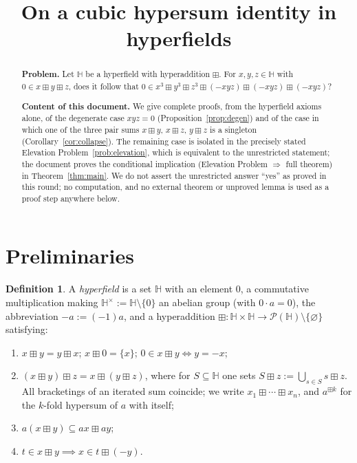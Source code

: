\documentclass[11pt]{article}
\title{On a cubic hypersum identity in hyperfields}
\author{}
\date{}
\theoremstyle{definition}
\newtheorem{definition}[theorem]{Definition}
\theoremstyle{remark}
\newcommand{\Hb}{\mathbb{H}}
\newcommand{\bp}{\boxplus}
\begin{document}
\maketitle

\begin{abstract}
\noindent\textbf{Problem.} Let $\Hb$ be a hyperfield with hyperaddition
$\boxplus$. For $x,y,z\in\Hb$ with $0\in x\bp y\bp z$, does it follow that
$0\in x^{3}\bp y^{3}\bp z^{3}\bp(-xyz)\bp(-xyz)\bp(-xyz)$?

\smallskip\noindent\textbf{Content of this document.} We give complete
proofs, from the hyperfield axioms alone, of the degenerate case $xyz=0$
(Proposition~\ref{prop:degen}) and of the case in which one of the three
pair sums $x\bp y$, $x\bp z$, $y\bp z$ is a singleton
(Corollary~\ref{cor:collapse}). The remaining case is isolated in the
precisely stated Elevation Problem~\ref{prob:elevation}, which is
equivalent to the unrestricted statement; the document proves the
conditional implication (Elevation Problem $\Rightarrow$ full theorem) in
Theorem~\ref{thm:main}. We do not assert the unrestricted answer ``yes''
as proved in this round; no computation, and no external theorem
or unproved lemma is used as a proof step anywhere below.
\end{abstract}

\section{Preliminaries}\label{sec:prelim}

\begin{definition}\label{def:hf}
A \emph{hyperfield} is a set $\Hb$ with an element $0$, a commutative
multiplication making $\Hb^\times:=\Hb\setminus\{0\}$ an abelian group
(with $0\cdot a=0$), the abbreviation $-a:=(-1)a$, and a hyperaddition
$\bp:\Hb\times\Hb\to\mathcal P(\Hb)\setminus\{\varnothing\}$ satisfying:
\begin{enumerate}[label=(H\arabic*)]
\item $x\bp y=y\bp x$;\; $x\bp0=\{x\}$;\; $0\in x\bp y\iff y=-x$;
\item $(x\bp y)\bp z=x\bp(y\bp z)$, where for $S\subseteq\Hb$ one sets
$S\bp z:=\bigcup_{s\in S}s\bp z$. All bracketings of an iterated sum
coincide; we write $x_1\bp\cdots\bp x_n$, and $a^{\bp k}$ for the $k$-fold
hypersum of $a$ with itself;
\item $a(x\bp y)\subseteq ax\bp ay$;
\item $t\in x\bp y\implies x\in t\bp(-y)$.
\end{enumerate}
\end{definition}
\end{document}
